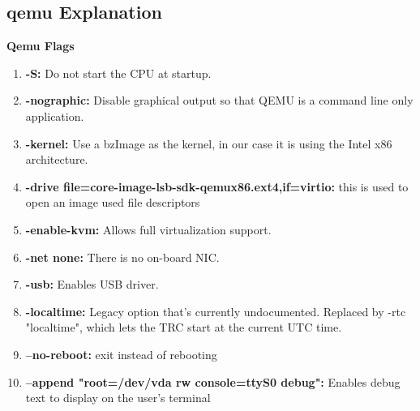 \documentclass[letterpaper,10pt]{article}
\begin{document}
\subsection{qemu Explanation}
{\bfseries Qemu Flags}\\
\begin{enumerate}
\item {\textbf{-S:}} Do not start the CPU at startup.\\
\item {\textbf{-nographic:}} Disable graphical output so that QEMU is a command line only application.\\
\item {\textbf{-kernel:}} Use a bzImage as the kernel, in our case it is using the Intel x86 architecture.\\
\item {\textbf{-drive file=core-image-lsb-sdk-qemux86.ext4,if=virtio:}} this is used to open an image used file descriptors\\
\item {\textbf{-enable-kvm:}} Allows full virtualization support.\\
\item {\textbf{-net none:}} There is no on-board NIC.\\
\item {\textbf{-usb:}} Enables USB driver.\\
\item {\textbf{-localtime:}} Legacy option that's currently undocumented. Replaced by -rtc "localtime", which lets the TRC start at the current UTC time.\\
\item {\textbf{--no-reboot:}} exit instead of rebooting\\
\item {\textbf{--append "root=/dev/vda rw console=ttyS0 debug":}} Enables debug text to display on the user's terminal\\\\
\end{enumerate}
\end{document}
